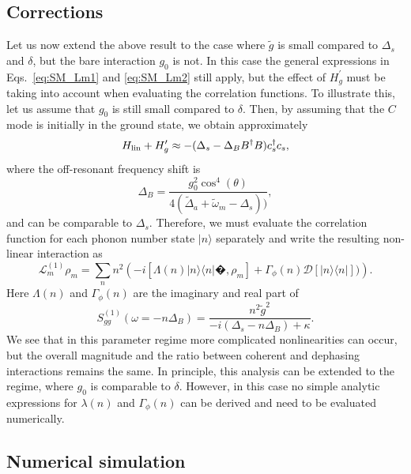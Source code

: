 \subsection{Corrections}

Let us now extend the above result to the case where $\tilde g$ is small
compared to $\Delta_s$ and $\delta$, but the bare interaction $g_0$ is not. In
this case the general expressions in Eqs.~\eqref{eq:SM_Lm1} and
\eqref{eq:SM_Lm2} still apply, but the effect of $H_g^\prime$ must be taking
into account when evaluating the correlation functions. To illustrate this, let
us assume that $g_0$ is still small compared to $\delta$. Then, by assuming that
the $C$ mode is initially in the ground state,  we obtain  approximately
\begin{equation}
H_{\rm lin} +H_g^\prime \approx - (\Delta_s- \Delta_B B^\dag B) c_s^\dag c_s,  
\end{equation}
where  the off-resonant frequency shift is 
\begin{equation}
\Delta_B= \frac{g_0^2\cos^4(\theta)}{4(\tilde \Delta_a+\tilde\omega_m
-\Delta_s))},
\end{equation}
and  can be comparable to $\Delta_s$. Therefore, we must evaluate the
correlation function for each phonon number state $|n\rangle$ separately and
write the resulting non-linear interaction as
\begin{equation}\label{eq:SM_EffectiveME_corr}
\mathcal{L}^{(1)}_m \rho_m = \sum_n n^2\left( -i  \left[\Lambda(n)
|n\rangle\langle n|�,\rho_m\right] + \Gamma_\phi(n)  \mathcal{D}
[|n\rangle\langle n| ])\right).
\end{equation}
Here $\Lambda(n)$ and $\Gamma_\phi(n)$   are the imaginary and real part of 
\begin{equation}
 S^{(1)}_{gg}(\omega=-n \Delta_B) =\frac{ n^2 \tilde g^2}{-i(\Delta_s-n\Delta_B)
 + \kappa}.
\end{equation}
We see that in this parameter regime more complicated nonlinearities can occur,
but the overall magnitude and the ratio between coherent and dephasing
interactions remains the same. In principle, this analysis can be extended to
the regime, where $g_0$ is comparable to $\delta$. However, in this case no
simple analytic expressions for $\lambda(n)$ and $\Gamma_\phi(n)$ can be derived
and need to be evaluated numerically.


\subsection{Numerical simulation} 

